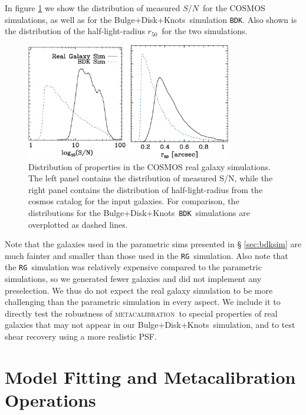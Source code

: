 \documentclass[iop]{emulateapj}
\newcommand{\snr}{$S/N$}
\newcommand{\hlr}{$r_{50}$}
\newcommand{\mcal}{\textsc{metacalibration}}
\newcommand{\bdkfull}{Bulge+Disk+Knots}
\newcommand{\bdksim}{\texttt{BDK}}
\newcommand{\rgsim}{\texttt{RG}}
\begin{document}
In figure \ref{fig:cosmos} we show the distribution of measured \snr\ for the
COSMOS simulations, as well as for the \bdkfull\ simulation
\bdksim.  Also shown is the distribution of the half-light-radius \hlr\
for the two simulations.

\begin{figure}
	\begin{center}
    \includegraphics[width=0.8\textwidth]{mcal-v14s01-s2n-and-r50-with-nsim.eps}

		\caption{Distribution of properties in the COSMOS real galaxy simulations. The
		left panel contains the distribution of measured S/N, while the right panel contains
		the distribution of half-light-radius from the cosmos catalog for the input
		galaxies.  For comparison, the distributions for the \bdkfull\ \bdksim\ simulations
		are overplotted as dashed lines.}
	\end{center}
\label{fig:cosmos}
\end{figure}


Note that the galaxies used in the parametric sims presented in \S
\ref{sec:bdksim} are much fainter and smaller than those used in the \rgsim\
simulation.  Also note that the \rgsim\ simulation was relatively expensive
compared to the parametric simulations, so we generated fewer galaxies and did
not implement any preselection.  We thus do not expect the real galaxy
simulation to be more challenging than the parametric simulation in every
aspect. We include it to directly test the robustness of \mcal\ to special
properties of real galaxies that may not appear in our \bdkfull\ simulation,
and to test shear recovery using a more realistic PSF.  


\section{Model Fitting and Metacalibration Operations} \label{sec:modelfit}
\end{document}
